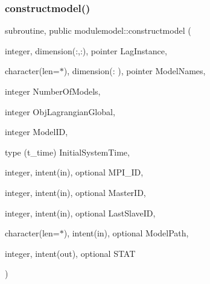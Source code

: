 \subsubsection{\texorpdfstring{constructmodel()}{constructmodel()}}
{\footnotesize\ttfamily subroutine, public modulemodel\+::constructmodel (\begin{DoxyParamCaption}\item[{integer, dimension(\+:,\+:), pointer}]{Lag\+Instance,  }\item[{character(len=$\ast$), dimension(\+:  ), pointer}]{Model\+Names,  }\item[{integer}]{Number\+Of\+Models,  }\item[{integer}]{Obj\+Lagrangian\+Global,  }\item[{integer}]{Model\+ID,  }\item[{type (t\+\_\+time)}]{Initial\+System\+Time,  }\item[{integer, intent(in), optional}]{M\+P\+I\+\_\+\+ID,  }\item[{integer, intent(in), optional}]{Master\+ID,  }\item[{integer, intent(in), optional}]{Last\+Slave\+ID,  }\item[{character(len=$\ast$), intent(in), optional}]{Model\+Path,  }\item[{integer, intent(out), optional}]{S\+T\+AT }\end{DoxyParamCaption})}

